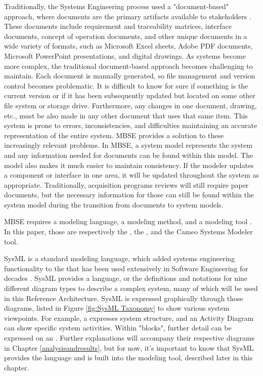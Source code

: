 Traditionally, the Systems Engineering process used a "document-based" approach, where documents are the primary artifacts available to stakeholders \citep{Delligatti}. These documents include requirement and traceability matrices, interface documents, concept of operation documents, and other unique documents in a wide variety of formats, such as Microsoft Excel sheets, Adobe PDF documents, Microsoft PowerPoint presentations, and digital drawings. As systems become more complex, the traditional document-based approach becomes challenging to maintain. Each document is manually generated, so file management and version control becomes problematic. It is difficult to know for sure if something is the current version or if it has been subsequently updated but located on some other file system or storage drive. Furthermore, any changes in one document, drawing, etc., must be also made in any other document that uses that same item. This system is prone to errors, inconsistencies, and difficulties maintaining an accurate representation of the entire system. MBSE provides a solution to these increasingly relevant problems. In MBSE, a system model represents the system and any information needed for documents can be found within this model. The model also makes it much easier to maintain consistency. If the modeler updates a component or interface in one area, it will be updated throughout the system as appropriate. Traditionally, acquisition programs reviews will still require paper documents, but the necessary information for those can still be found within the system model during the transition from documents to system models. 

MBSE requires a modeling language, a modeling method, and a modeling tool \citep{Delligatti}. In this paper, those are respectively the , the , and the Cameo Systems Modeler tool.  

SysML is a standard modeling language, which added systems engineering functionality to the  that has been used extensively in Software Engineering for decades \citep{Delligatti}. SysML provides a language, or the definitions and notations for nine different diagram types to describe a complex system, many of which will be used in this Reference Architecture. SysML is expressed graphically through those diagrams, listed in Figure \ref{fig:SysML Taxonomy} to show various system viewpoints. For example, a  expresses system structure, and an Activity Diagram can show specific system activities. Within "blocks", further detail can be expressed on an . Further explanations will accompany their respective diagrams in Chapter \ref{analysisandresults}, but for now, it's important to know that SysML provides the language and is built into the modeling tool, described later in this chapter. 

